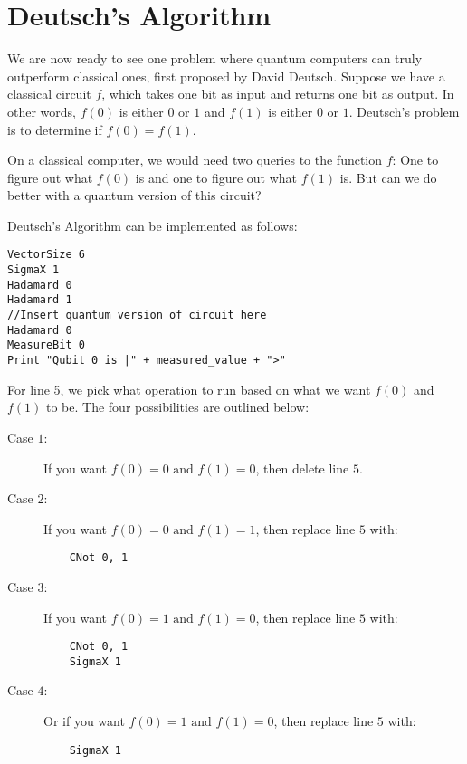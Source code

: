 \documentclass[twocolumn]{article}
\begin{document}
\section{Deutsch's Algorithm}
\label{sec:deutschs-algm}

We are now ready to see one problem where quantum computers can truly outperform classical ones, first proposed by David Deutsch. Suppose we have a classical circuit $f$, which takes one bit as input and returns one bit as output. In other words, $f(0)$ is either $0$ or $1$ and $f(1)$ is either $0$ or $1$. Deutsch's problem is to determine if $f(0) = f(1)$.

On a classical computer, we would need two queries to the function $f$: One to figure out what $f(0)$ is and one to figure out what $f(1)$ is. But can we do better with a quantum version of this circuit?

Deutsch's Algorithm can be implemented as follows:

\begin{lstlisting}
VectorSize 6
SigmaX 1
Hadamard 0
Hadamard 1
//Insert quantum version of circuit here
Hadamard 0
MeasureBit 0
Print "Qubit 0 is |" + measured_value + ">"
\end{lstlisting}

For line 5, we pick what operation to run based on what we want $f(0)$ and $f(1)$ to be. The four possibilities are outlined below:

\begin{description}
    \item[Case $1$:] If you want $f(0) = 0 \text{ and } f(1) = 0$, then delete line $5$.

    \item[Case $2$:] If you want $f(0) = 0 \text{ and } f(1) = 1$, then replace line $5$ with:

    \begin{lstlisting}
    CNot 0, 1
    \end{lstlisting}

    \item[Case $3$:] If you want $f(0) = 1 \text{ and } f(1) = 0$, then replace line $5$ with:

    \begin{lstlisting}
    CNot 0, 1
    SigmaX 1
    \end{lstlisting}

    \item[Case $4$:] Or if you want $f(0) = 1 \text{ and } f(1) = 0$, then replace line $5$ with:

    \begin{lstlisting}
    SigmaX 1
    \end{lstlisting}
\end{description}
\end{document}
